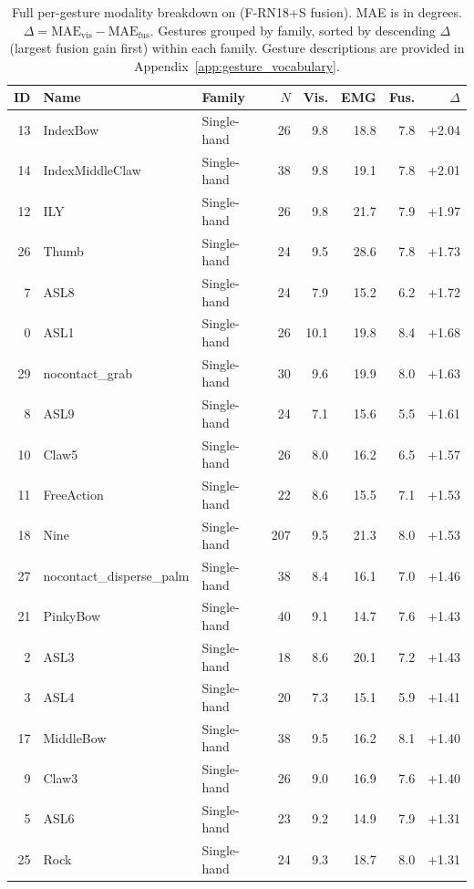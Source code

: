 \begin{table}[h]
\centering
\caption{Full per-gesture modality breakdown on \dataset{} (F-RN18+S fusion). MAE is in degrees. $\Delta = \text{MAE}_\text{vis} - \text{MAE}_\text{fus}$. Gestures grouped by family, sorted by descending $\Delta$ (largest fusion gain first) within each family. Gesture descriptions are provided in Appendix~\ref{app:gesture_vocabulary}.}
\label{tab:per_gesture_full}
\scriptsize
\setlength{\tabcolsep}{2.2pt}
\renewcommand{\arraystretch}{1.02}
\begin{tabular}{rllrrrrr}
\toprule
ID & Name & Family & $N$ & Vis. & EMG & Fus. & $\Delta$ \\
\midrule
13 & IndexBow & Single-hand & 26 & 9.8 & 18.8 & 7.8 & +2.04 \\
14 & IndexMiddleClaw & Single-hand & 38 & 9.8 & 19.1 & 7.8 & +2.01 \\
12 & ILY & Single-hand & 26 & 9.8 & 21.7 & 7.9 & +1.97 \\
26 & Thumb & Single-hand & 24 & 9.5 & 28.6 & 7.8 & +1.73 \\
7 & ASL8 & Single-hand & 24 & 7.9 & 15.2 & 6.2 & +1.72 \\
0 & ASL1 & Single-hand & 26 & 10.1 & 19.8 & 8.4 & +1.68 \\
29 & nocontact\_grab & Single-hand & 30 & 9.6 & 19.9 & 8.0 & +1.63 \\
8 & ASL9 & Single-hand & 24 & 7.1 & 15.6 & 5.5 & +1.61 \\
10 & Claw5 & Single-hand & 26 & 8.0 & 16.2 & 6.5 & +1.57 \\
11 & FreeAction & Single-hand & 22 & 8.6 & 15.5 & 7.1 & +1.53 \\
18 & Nine & Single-hand & 207 & 9.5 & 21.3 & 8.0 & +1.53 \\
27 & nocontact\_disperse\_palm & Single-hand & 38 & 8.4 & 16.1 & 7.0 & +1.46 \\
21 & PinkyBow & Single-hand & 40 & 9.1 & 14.7 & 7.6 & +1.43 \\
2 & ASL3 & Single-hand & 18 & 8.6 & 20.1 & 7.2 & +1.43 \\
3 & ASL4 & Single-hand & 20 & 7.3 & 15.1 & 5.9 & +1.41 \\
17 & MiddleBow & Single-hand & 38 & 9.5 & 16.2 & 8.1 & +1.40 \\
9 & Claw3 & Single-hand & 26 & 9.0 & 16.9 & 7.6 & +1.40 \\
5 & ASL6 & Single-hand & 23 & 9.2 & 14.9 & 7.9 & +1.31 \\
25 & Rock & Single-hand & 24 & 9.3 & 18.7 & 8.0 & +1.31 \\

\end{tabular}
\end{table}
